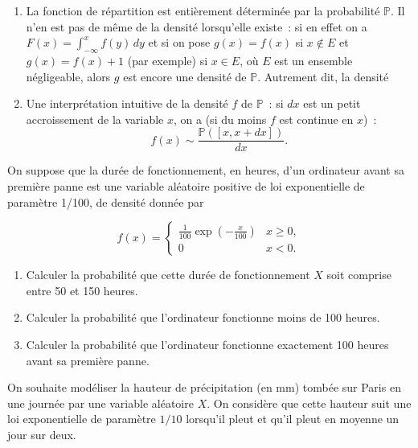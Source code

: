 \begin{remarque}\label{I-remarques-1}
\begin{enumerate}
\def\labelenumi{\arabic{enumi}.}
\item
  La fonction de répartition est entièrement déterminée par la
  probabilité \(\mathbb{P}\). Il n'en est pas de même de la densité
  lorsqu'elle existe~: si en effet on a
  \(F(x) =\int_{-\infty}^x f(y)\, dy\) et si on pose \(g(x) = f(x)\) si
  \(x \notin E\) et \(g(x) =f(x)+1\) (par exemple) si \(x\in E\), où
  \(E\) est un ensemble négligeable, alors \(g\) est encore une densité
  de \(\mathbb{P}\). Autrement dit, la densité
\item
  Une interprétation intuitive de la densité \(f\) de \(\mathbb{P}\)~:
  si \(dx\) est un petit accroissement de la variable \(x\), on a (si du
  moins \(f\) est continue en \(x\))~:
  \[ f(x) \sim \frac{\mathbb{P}([x,x+dx])}{dx}.\]
\end{enumerate}
\end{remarque}

\label{I-ex.expo}
On suppose que la durée de fonctionnement, en heures, d'un ordinateur
avant sa première panne est une variable aléatoire positive de loi
exponentielle de paramètre 1/100, de densité donnée par

\[f(x) = \left\{ \begin{array}{ll}
        \frac{1}{100}\exp\left(-\frac{x}{100}\right) & x \geq 0, \\
        0 & x < 0.
        \end{array}
        \right.\]

\begin{enumerate}
\def\labelenumi{\arabic{enumi}.}
\tightlist
\item
  Calculer la probabilité que cette durée de fonctionnement \(X\) soit
  comprise entre 50 et 150 heures.
\item
  Calculer la probabilité que l'ordinateur fonctionne moins de 100
  heures.
\item
  Calculer la probabilité que l'ordinateur fonctionne exactement 100
  heures avant sa première panne.
\end{enumerate}


\label{I-ex.pluie}
On souhaite modéliser la hauteur de précipitation (en mm) tombée sur
Paris en une journée par une variable aléatoire \(X\). On considère que
cette hauteur suit une loi exponentielle de paramètre \(1/10\) lorsqu'il
pleut et qu'il pleut en moyenne un jour sur deux.

